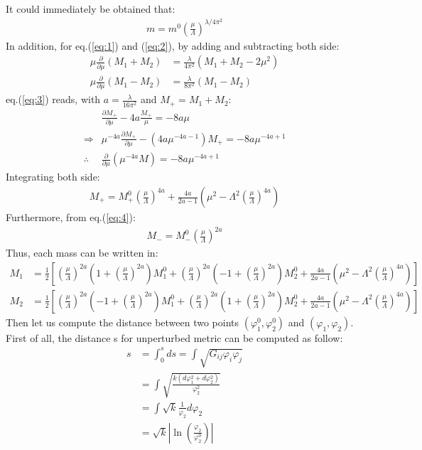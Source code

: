 \documentclass[fleqn]{article}
\begin{document}
It could immediately be obtained that:
\begin{align}
m = m^{0} (\frac{\mu}{\Lambda})^{\lambda / 4\pi^{2}}
\end{align}
In addition, for eq.(\ref{eq:1}) and (\ref{eq:2}), by adding and subtracting both side:
\begin{align}[left=\empheqlbrace]
\label{eq:3}
\mu \frac{\partial}{\partial \mu} (M_{1} + M_{2}) &= \frac{\lambda}{4\pi ^{2}}(M_{1} + M_{2} -2\mu^{2}) \\
\label{eq:4}
\mu \frac{\partial}{\partial \mu} (M_{1} - M_{2}) & = \frac{\lambda}{8\pi^{2}} (M_{1} - M_{2}) 
\end{align}
eq.(\ref{eq:3}) reads, with $a= \frac{\lambda}{16\pi^{2}}$ and $M_{+} = M_{1} + M_{2}$:
\begin{align}
&\frac{\partial M_{+}}{\partial \mu} -4a \frac{M_{+}}{\mu}= -8a\mu   \nonumber \\
\Rightarrow & \mu ^{-4a} \frac{\partial M_{+}}{\partial \mu} - (4a\mu^{-4a-1})M_{+} = -8a\mu^{-4a+1} \nonumber \\
\therefore & \frac{\partial}{\partial \mu} (\mu^{-4a} M) = -8a\mu ^{-4a+1}
\end{align}
Integrating both side:
\begin{align}
\label{eq:5}
M_{+} = M_{+}^{0} (\frac{\mu}{\Lambda})^{4a} + \frac{4a}{2a-1} (\mu^{2} - \Lambda ^{2} (\frac{\mu}{\Lambda})^{4a})
\end{align}
Furthermore, from eq.(\ref{eq:4}):
\begin{align}
\label{eq:6}
M_{-} = M_{-}^0 (\frac{\mu}{\Lambda})^{2a}
\end{align}
Thus, each mass can be written in:
\begin{align}
M_{1} &= \frac{1}{2} [(\frac{\mu}{\Lambda})^{2a} (1+ (\frac{\mu}{\Lambda})^{2a})M_{1} ^{0} + (\frac{\mu}{\Lambda})^{2a} (-1 + (\frac{\mu}{\Lambda})^{2a}) M_{2}^{0} + \frac{4a}{2a-1} (\mu^{2} - \Lambda  ^{2} (\frac{\mu}{\Lambda})^{4a})] \\
M_{2} &= \frac{1}{2} [(\frac{\mu}{\Lambda})^{2a} (-1+ (\frac{\mu}{\Lambda})^{2a})M_{1} ^{0} + (\frac{\mu}{\Lambda})^{2a} (1 + (\frac{\mu}{\Lambda})^{2a}) M_{2}^{0} + \frac{4a}{2a-1} (\mu^{2} - \Lambda  ^{2} (\frac{\mu}{\Lambda})^{4a})] 
\end{align}
\indent Then let us compute the distance between two points $(\varphi_{1} ^{0}, \varphi_{2}^{0})$ and $(\varphi_{1},\varphi _{2})$. First of all, the distance s for unperturbed metric can be computed as follow:
\begin{align}
s &= \int _{0} ^{s} ds = \int \sqrt{G_{ij} \varphi_{i}\varphi_{j}} \nonumber \\
& = \int \sqrt{\frac{k(d\varphi_{1}^{2} + d\varphi_{2}^{2} )}{\varphi_{2}^{2}}} \nonumber \\
&= \int \sqrt{k} \frac{1}{\varphi_{2}} d\varphi _{2} \nonumber \\
\label{eq:7}
&= \sqrt{k} |\ln (\frac{\varphi_{2}} {\varphi_{2} ^{0}})| 
\end{align}
\end{document}
